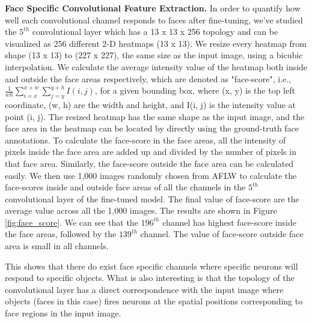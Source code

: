 \documentclass[10pt,twocolumn,letterpaper]{article}
\begin{document}
{\bf Face Specific Convolutional Feature Extraction.} In order to quantify how well each convolutional channel responds to faces after fine-tuning, we've studied the $5^{th}$ convolutional layer which has a 13 x 13 x 256 topology and can be visualized as 256 different 2-D heatmaps (13 x 13). We resize every heatmap from shape (13 x 13) to (227 x 227), the same size as the input image, using a bicubic interpolation. We calculate the average intensity value of the heatmap both inside and outside the face areas respectively, which are denoted as "face-score", i.e., $\frac{1}{wh}\sum_{i=x}^{x+w} \sum_{j=y}^{y+h} I(i, j)$, for a given bounding box, where (x, y) is the top left coordinate, (w, h) are the width and height, and I(i, j) is the intensity value at point (i, j). The resized heatmap has the same shape as the input image, and the face area in the heatmap can be located by directly using the ground-truth face annotations. To calculate the face-score in the face areas, all the intensity of pixels inside the face area are added up and divided by the number of pixels in that face area. Similarly, the face-score outside the face area can be calculated easily. We then use 1,000 images randomly chosen from AFLW \cite{kostinger2011annotated} to calculate the face-scores inside and outside face areas of all the channels in the $5^{th}$ convolutional layer of the fine-tuned model. The final value of face-score are the average value across all the 1,000 images. The results are shown in Figure \ref{fig:face_score}. We can see that the $196^{th}$ channel has highest face-score inside the face areas, followed by the $139^{th}$ channel. The value of face-score outside face area is small in all channels. 


This shows that there do exist face specific channels where specific neurons will respond to specific objects. What is also interesting is that the topology of the convolutional layer has a direct correspondence with the input image where objects (faces in this case) fires neurons at the spatial positions corresponding to face regions in the input image. 
\end{document}
